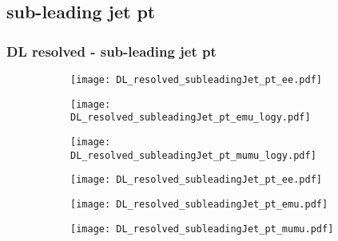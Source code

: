 \documentclass[aspectratio=169,8pt]{beamer}
\begin{document}
\subsection{sub-leading jet pt}
\begin{frame}
\frametitle{DL resolved - sub-leading jet pt}
\begin{figure}
\captionsetup[subfigure]{labelformat=empty}
\begin{subfigure}{0.32\textwidth}
\texttt{[image: DL\_resolved\_subleadingJet\_pt\_ee.pdf]}
\vspace*{-0.15cm}
\end{subfigure}
\hfil
\begin{subfigure}{0.32\textwidth}
\texttt{[image: DL\_resolved\_subleadingJet\_pt\_emu\_logy.pdf]}
\vspace*{-0.15cm}
\end{subfigure}
\hfil
\begin{subfigure}{0.32\textwidth}
\texttt{[image: DL\_resolved\_subleadingJet\_pt\_mumu\_logy.pdf]}
\vspace*{-0.15cm}
\end{subfigure}
\hfil
\begin{subfigure}{0.32\textwidth}
\texttt{[image: DL\_resolved\_subleadingJet\_pt\_ee.pdf]}
\vspace*{-0.15cm}
\end{subfigure}
\hfil
\begin{subfigure}{0.32\textwidth}
\texttt{[image: DL\_resolved\_subleadingJet\_pt\_emu.pdf]}
\vspace*{-0.15cm}
\end{subfigure}
\hfil
\begin{subfigure}{0.32\textwidth}
\texttt{[image: DL\_resolved\_subleadingJet\_pt\_mumu.pdf]}
\vspace*{-0.15cm}
\end{subfigure}
\hfil
\end{figure}
\end{frame}
\newpage
\end{document}
